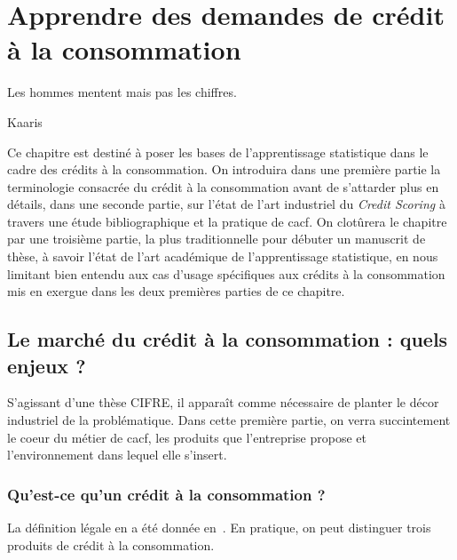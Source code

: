 \chapter{Apprendre des demandes de crédit à la consommation} \label{chap1}
\minitoc

\epigraph{Les hommes mentent mais pas les chiffres.}{Kaaris}

Ce chapitre est destiné à poser les bases de l'apprentissage statistique dans le cadre des crédits à la consommation. On introduira dans une première partie la terminologie consacrée du crédit à la consommation avant de s'attarder plus en détails, dans une seconde partie, sur l'état de l'art industriel du \textit{Credit Scoring} à travers une étude bibliographique et la pratique de \gls{cacf}. On clotûrera le chapitre par une troisième partie, la plus traditionnelle pour débuter un manuscrit de thèse, à savoir l'état de l'art académique de l'apprentissage statistique, en nous limitant bien entendu aux cas d'usage spécifiques aux crédits à la consommation mis en exergue dans les deux premières parties de ce chapitre.

\section{Le marché du crédit à la consommation : quels enjeux ?} \label{chap1:sec1}

S'agissant d'une thèse CIFRE, il apparaît comme nécessaire de planter le décor industriel de la problématique. Dans cette première partie, on verra succintement le coeur du métier de \gls{cacf}, les produits que l'entreprise propose et l'environnement dans lequel elle s'insert.

\subsection{Qu'est-ce qu'un crédit à la consommation ?}

La définition légale en a été donnée en~. En pratique, on peut distinguer trois produits de crédit à la consommation.



